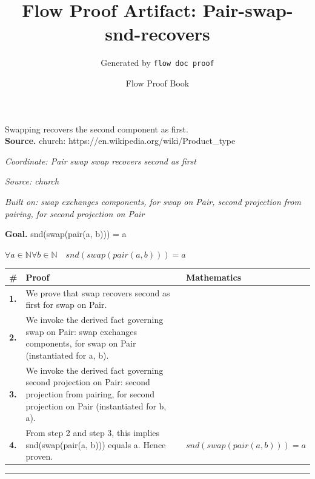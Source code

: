 \documentclass[11pt]{article}
\title{Flow Proof Artifact: Pair-swap-snd-recovers}
\author{Generated by \texttt{flow doc proof}}
\date{Flow Proof Book}
\theoremstyle{definition}
\begin{document}
\maketitle
Swapping recovers the second component as first.\\[0.5em]
\textbf{Source.} church: https://en.wikipedia.org/wiki/Product\_type\\[0.5em]
\bigskip
{}\par
\smallskip\noindent\textit{Coordinate: Pair \cdot swap \cdot swap recovers second as first}\par
\smallskip\noindent\textit{Source: church}\par
\smallskip\noindent\textit{Built on: swap exchanges components, for swap on Pair, second projection from pairing, for second projection on Pair}\par
\medskip
\noindent\textbf{Goal.} snd(swap(pair(a, b))) = a\par
\noindent$\displaystyle \forall a \in \mathbb{N} \forall b \in \mathbb{N}\quad snd(swap(pair(a, b))) = a$\par
\medskip
\noindent
\begin{tabular}{@{} >{\raggedright\arraybackslash}p{} >{\raggedright\arraybackslash}p{} >{\raggedleft\arraybackslash}p{} @{}}
\textbf{\#} & \textbf{Proof} & \textbf{Mathematics} \\
\midrule
\textbf{1.} & We prove that swap recovers second as first for swap on Pair. & \\[0.45em]
\textbf{2.} & We invoke the derived fact governing swap on Pair: swap exchanges components, for swap on Pair (instantiated for a, b). & \\[0.45em]
\textbf{3.} & We invoke the derived fact governing second projection on Pair: second projection from pairing, for second projection on Pair (instantiated for b, a). & \\[0.45em]
\textbf{4.} & From step 2 and step 3, this implies snd(swap(pair(a, b))) equals a. Hence proven. & $\displaystyle snd(swap(pair(a, b))) = a$ \\[0.45em]
\bottomrule
\end{tabular}
\label{thm:Pair-swap-swap_recovers_second_as_first}
\par\medskip\hrule
\end{document}
